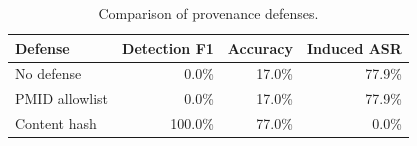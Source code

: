 \begin{table}[t]
\centering
\caption{Comparison of provenance defenses.}
\label{tab:defense-results}
\begin{tabular}{lrrr}
\hline
Defense & Detection F1 & Accuracy & Induced ASR \\
\hline
No defense & 0.0\% & 17.0\% & 77.9\% \\
PMID allowlist & 0.0\% & 17.0\% & 77.9\% \\
Content hash & 100.0\% & 77.0\% & 0.0\% \\
\hline
\end{tabular}
\end{table}
